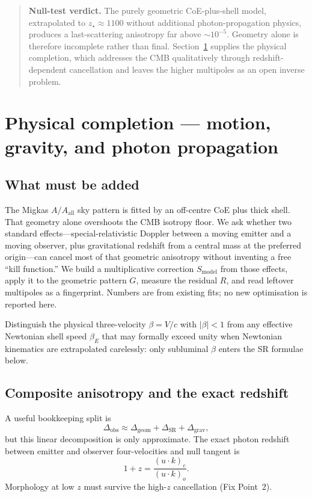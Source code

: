\documentclass[11pt,a4paper]{article}
\begin{document}
\begin{quote}
\textbf{Null-test verdict.} The purely geometric CoE-plus-shell model, extrapolated to \(z_\star\approx1100\) without additional photon-propagation physics, produces a last-scattering anisotropy far above \(\sim10^{-5}\). Geometry alone is therefore incomplete rather than final. Section~\ref{sec:sr} supplies the physical completion, which addresses the CMB qualitatively through redshift-dependent cancellation and leaves the higher multipoles as an open inverse problem.
\end{quote}

\section{Physical completion --- motion, gravity, and photon propagation}
\label{sec:sr}

\subsection{What must be added}

The Migkas \(A/A_{\mathrm{all}}\) sky pattern is fitted by an off-centre CoE plus thick shell. That geometry alone overshoots the CMB isotropy floor. We ask whether two standard effects---special-relativistic Doppler between a moving emitter and a moving observer, plus gravitational redshift from a central mass at the preferred origin---can cancel most of that geometric anisotropy without inventing a free ``kill function.'' We build a multiplicative correction \(S_{\mathrm{model}}\) from those effects, apply it to the geometric pattern \(G\), measure the residual \(R\), and read leftover multipoles as a fingerprint. Numbers are from existing fits; no new optimisation is reported here.

Distinguish the physical three-velocity \(\beta=V/c\) with \(|\beta|<1\) from any effective Newtonian shell speed \(\beta_E\) that may formally exceed unity when Newtonian kinematics are extrapolated carelessly: only subluminal \(\beta\) enters the SR formulae below.

\subsection{Composite anisotropy and the exact redshift}

A useful bookkeeping split is
\begin{equation}
\Delta_{\mathrm{obs}} \approx \Delta_{\mathrm{geom}} + \Delta_{\mathrm{SR}} + \Delta_{\mathrm{grav}},
\end{equation}
but this linear decomposition is only approximate. The exact photon redshift between emitter and observer four-velocities and null tangent is
\begin{equation}
1+z = \frac{(u\cdot k)_e}{(u\cdot k)_o}.
\end{equation}
Morphology at low \(z\) must survive the high-\(z\) cancellation (Fix Point~2).
\end{document}
